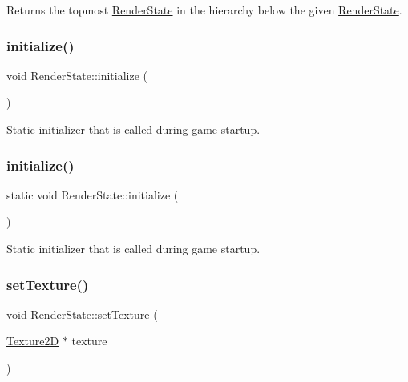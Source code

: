 Returns the topmost \hyperlink{classRenderState}{Render\+State} in the hierarchy below the given \hyperlink{classRenderState}{Render\+State}. \mbox{\label{classRenderState_a737670247e99a7077a5f20341287e9c1}} 
\subsubsection{\texorpdfstring{initialize()}{initialize()}\hspace{0.1cm}{\footnotesize\ttfamily [1/2]}}
{\footnotesize\ttfamily void Render\+State\+::initialize (\begin{DoxyParamCaption}{ }\end{DoxyParamCaption})\hspace{0.3cm}{\ttfamily [static]}}

Static initializer that is called during game startup. \mbox{\label{classRenderState_a3b8fd9c2beaab0636242434bc8e81749}} 
\subsubsection{\texorpdfstring{initialize()}{initialize()}\hspace{0.1cm}{\footnotesize\ttfamily [2/2]}}
{\footnotesize\ttfamily static void Render\+State\+::initialize (\begin{DoxyParamCaption}{ }\end{DoxyParamCaption})\hspace{0.3cm}{\ttfamily [static]}}

Static initializer that is called during game startup. \mbox{\label{classRenderState_ae41fdde5c9e67eb4e5967c8de711cda6}} 
\subsubsection{\texorpdfstring{set\+Texture()}{setTexture()}\hspace{0.1cm}{\footnotesize\ttfamily [1/2]}}
{\footnotesize\ttfamily void Render\+State\+::set\+Texture (\begin{DoxyParamCaption}\item[{\hyperlink{classTexture2D}{Texture2D} $\ast$}]{texture }\end{DoxyParamCaption})}

